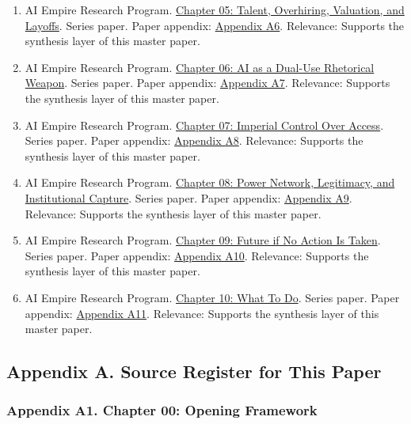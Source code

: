 \documentclass[
  american,
  11pt,
  letterpaper,
]{article}
\begin{document}
\begin{enumerate}
{  A5}. Relevance: Supports the synthesis layer of this master paper.
\item
  AI Empire Research Program.
  \href{05_talent-overhiring-layoffs_paper.html}{Chapter 05: Talent,
  Overhiring, Valuation, and Layoffs}. Series paper. Paper appendix:
  \hyperref[appendix-a6-chapter-05-talent-overhiring-valuation-and-layoffs]{Appendix
  A6}. Relevance: Supports the synthesis layer of this master paper.
\item
  AI Empire Research Program.
  \href{06_dual-use-rhetorical-weapon_paper.html}{Chapter 06: AI as a
  Dual-Use Rhetorical Weapon}. Series paper. Paper appendix:
  \hyperref[appendix-a7-chapter-06-ai-as-a-dual-use-rhetorical-weapon]{Appendix
  A7}. Relevance: Supports the synthesis layer of this master paper.
\item
  AI Empire Research Program.
  \href{07_imperial-control-over-access_paper.html}{Chapter 07: Imperial
  Control Over Access}. Series paper. Paper appendix:
  \hyperref[appendix-a8-chapter-07-imperial-control-over-access]{Appendix
  A8}. Relevance: Supports the synthesis layer of this master paper.
\item
  AI Empire Research Program.
  \href{08_legitimacy-and-institutional-capture_paper.html}{Chapter 08:
  Power Network, Legitimacy, and Institutional Capture}. Series paper.
  Paper appendix:
  \hyperref[appendix-a9-chapter-08-power-network-legitimacy-and-institutional-capture]{Appendix
  A9}. Relevance: Supports the synthesis layer of this master paper.
\item
  AI Empire Research Program.
  \href{09_future-if-unchecked_paper.html}{Chapter 09: Future if No
  Action Is Taken}. Series paper. Paper appendix:
  \hyperref[appendix-a10-chapter-09-future-if-no-action-is-taken]{Appendix
  A10}. Relevance: Supports the synthesis layer of this master paper.
\item
  AI Empire Research Program.
  \href{10_three-reform-program_paper.html}{Chapter 10: What To Do}.
  Series paper. Paper appendix:
  \hyperref[appendix-a11-chapter-10-what-to-do]{Appendix A11}.
  Relevance: Supports the synthesis layer of this master paper.
\end{enumerate}

\subsection{Appendix A. Source Register for This
Paper}\label{appendix-a.-source-register-for-this-paper}

\subsubsection{Appendix A1. Chapter 00: Opening
Framework}\label{appendix-a1-chapter-00-opening-framework}
\end{document}
